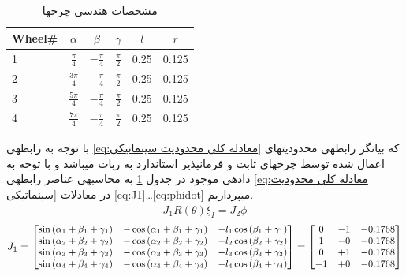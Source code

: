 \documentclass[10pt,a4paper]{article}
\newcommand{\نیمفاصله}{\halfspace}
\renewcommand{\ }{\halfspace}
\begin{document}
\begin{table}[H]
    \centering
    \begin{latin}
        \begin{tabular}{ |p{1.5cm}|c|c|c|c|c| }
            \hline
            Wheel\# &
            $\alpha$ &
            $\beta$  &
            $\gamma$ &
            $l$      &
            $r$      \\
            \hline
            1 & $\frac{\pi}{4}$  & $-\frac{\pi}{4}$ & $\frac{\pi}{2}$ & {\small 0.25 } & {\small 0.125}\\
            \hline
            2 & $\frac{3\pi}{4}$ & $-\frac{\pi}{4}$ & $\frac{\pi}{2}$ & {\small 0.25 } & {\small 0.125}\\
            \hline
            3 & $\frac{5\pi}{4}$ & $-\frac{\pi}{4}$ & $\frac{\pi}{2}$ & {\small 0.25 } & {\small 0.125}\\
            \hline
            4 & $\frac{7\pi}{4}$ & $-\frac{\pi}{4}$ & $\frac{\pi}{2}$ & {\small 0.25 } & {\small 0.125}\\
            \hline
        \end{tabular}
    \end{latin}
    \caption{مشخصات هندسی چرخ\ ها}
    \label{table:مشخصات هندسی چرخ ها}
\end{table}
با توجه به رابطه\ ی
\ref{eq:معادله کلی محدودیت سینماتیکی}
که بیانگر رابطه\ ی محدودیت\ های اعمال شده توسط چرخ\ های ثابت و فرمان\ پذیر استاندارد به ربات می\ باشد و با توجه به داده\ ی موجود در جدول
\ref{table:مشخصات هندسی چرخ ها}
به محاسبه\ ی عناصر رابطه\ ی
\ref{eq:معادله کلی محدودیت سینماتیکی}
در معادلات
\ref{eq:J1}\ldots\ref{eq:phidot}
می\ پردازیم.
    \begin{equation}
        J_1R(\theta)\dot{\xi}_I = J_2\dot{\phi}
        \label{eq:معادله کلی محدودیت سینماتیکی}
    \end{equation}
    \begin{equation}\small
    J_1 = \begin{bmatrix}
            \sin{(\alpha_1 + \beta_1 + \gamma_1)} & -\cos{(\alpha_1 + \beta_1 + \gamma_1)} & -l_1\cos{(\beta_1 + \gamma_1)}\\
            \sin{(\alpha_2 + \beta_2 + \gamma_2)} & -\cos{(\alpha_2 + \beta_2 + \gamma_2)} & -l_2\cos{(\beta_2 + \gamma_2)}\\
            \sin{(\alpha_3 + \beta_3 + \gamma_3)} & -\cos{(\alpha_3 + \beta_3 + \gamma_3)} & -l_3\cos{(\beta_3 + \gamma_3)}\\
            \sin{(\alpha_4 + \beta_4 + \gamma_4)} & -\cos{(\alpha_4 + \beta_4 + \gamma_4)} & -l_4\cos{(\beta_4 + \gamma_4)}\\
    \end{bmatrix} = \begin{bmatrix}
    0    &    -1    &    -0.1768\\
    1    &    -0    &    -0.1768\\
    0    &    +1    &    -0.1768\\
   -1    &    +0    &    -0.1768\\
    \end{bmatrix}
    \label{eq:J1}
    \end{equation}
\end{document}
